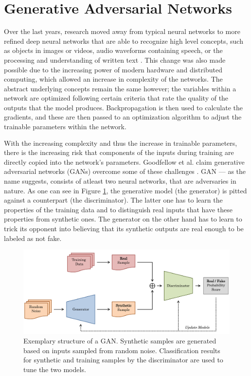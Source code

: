 \section{Generative Adversarial Networks} \label{sec:gans}

Over the last years, research moved away from typical neural networks \cite{haykin1994neural} to more refined deep neural networks that are able to recognize high level concepts, such as objects in images or videos, audio waveforms containing speech, or the processing and understanding of written text \cite{bengio2009learning}. This change was also made possible due to the increasing power of modern hardware and distributed computing, which allowed an increase in complexity of the networks. The abstract underlying concepts remain the same however; the variables within a network are optimized following certain criteria that rate the quality of the outputs that the model produces. Backpropagation is then used to calculate the gradients, and these are then passed to an optimization algorithm to adjust the trainable parameters within the network.

With the increasing complexity and thus the increase in trainable parameters, there is the increasing risk that components of the inputs during training are directly copied into the network's parameters. Goodfellow et al. claim generative adversarial networks (GANs) overcome some of these challenges \cite{goodfellow2014generative}. GAN --- as the name suggests, consists of atleast two neural networks, that are adversaries in nature. As one can see in Figure \ref{fig:gan}, the generative model (the generator) is pitted against a counterpart (the discriminator). The latter one has to learn the properties of the training data and to distinguish real inputs that have these properties from synthetic ones. The generator on the other hand has to learn to trick its opponent into believing that its synthetic outputs are real enough to be labeled as not fake. 

\begin{figure}
	\centering
	\includegraphics[width=1\textwidth]{graphics/gan/gan/gan.pdf}
  \caption[Structure of a GAN.]{Exemplary structure of a GAN. Synthetic samples are generated based on inputs sampled from random noise. Classification results for synthetic and training samples by the discriminator are used to tune the two models.}
  \label{fig:gan}
\end{figure}

